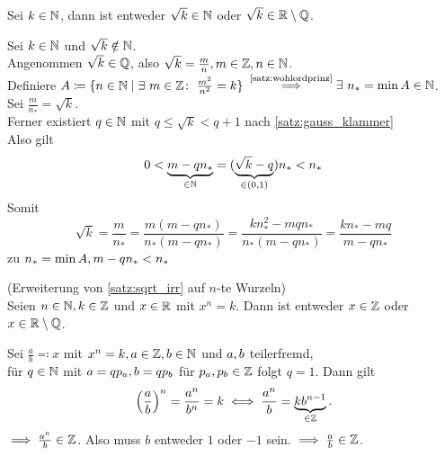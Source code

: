 \documentclass[../ana1.tex]{subfiles}
\begin{document}
\begin{satz}\label{satz:sqrt_irr}
	Sei \(k \in \mathbb{N} \), dann ist entweder \(\sqrt{k} \in \mathbb{N} \) oder \(\sqrt{k} \in \mathbb{R} \setminus \mathbb{Q} \).
\end{satz}
\begin{bew}
	Sei \(k \in \mathbb{N} \) und \(\sqrt{k} \notin \mathbb{N} \). \\
	Angenommen \(\sqrt{k} \in \mathbb{Q} \), also \(\sqrt{k} = \frac{m}{n} , m \in \mathbb{Z} , n \in \mathbb{N} \). \\
	Definiere \(A \coloneqq \set{n \in \N \; \vert \; \exists \, m \in \Z \colon \; \frac{m^2}{n^2} = k} \)
	\(\overset{\text{\autoref{satz:wohlordprinz}}}{\implies}\exists \, n_* = \min A \in \N \). \\
	Sei \(\frac{m}{n_*} = \sqrt{k} \).\\
	Ferner existiert \(q \in \mathbb{N} \) mit \(q \leq \sqrt{k} < q+1 \) nach \autoref{satz:gauss_klammer} \\
	Also gilt
	\[ 0 < \underbrace{m-qn_*}_{\in \mathbb{N}} = (\underbrace{\sqrt{k}-q}_{\in (0 , 1)})n_* < n_* \]
	Somit 
	\[ \sqrt{k} = \frac{m}{n_*} = \frac{m(m - qn_*)}{n_*(m - qn_*)} = \frac{kn_*^2 - mqn_*}{n_*(m - qn_*)}=\frac{kn_* - mq}{m - qn_*} \]
	\Lightning{} zu \(n_* = \min A , m-qn_* < n_* \)
\end{bew}

\iftoggle{short}{}{\newpage}%

\begin{bem}(Erweiterung von \autoref{satz:sqrt_irr} auf \(n \)-te Wurzeln) \leavevmode \\
	Seien \(n \in \mathbb{N} , k \in \mathbb{Z} \) und \(x \in \mathbb{R} \) mit \(x^n = k \). Dann ist entweder \(x \in \mathbb{Z} \) oder \(x \in \mathbb{R} \setminus \mathbb{Q} \).
\end{bem}
\begin{bew}
	Sei \(\frac{a}{b} \eqqcolon x \) mit \(x^n = k , a \in \mathbb{Z} , b \in \mathbb{N} \) und \(a , b\) teilerfremd, \\
	\dphp{} für \(q \in \mathbb{N} \) mit \(a = qp_a , b = qp_b \) für \(p_a , p_b \in \mathbb{Z} \) folgt \(q = 1 \).
	Dann gilt
	\[{\left(\frac{a}{b}\right)}^n = \frac{a^n}{b^n} = k \iff \frac{a^n}{b} = \underbrace{kb^{n - 1}}_{\in \mathbb{Z}}. \]
	\(\implies \frac{a^n}{b} \in \mathbb{Z} \). Also muss \(b \) entweder \(1 \) oder \(\minus 1 \) sein.
	\(\implies \frac{a}{b} \in \mathbb{Z} \).
\end{bew}
\end{document}
